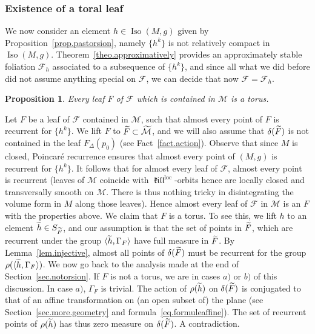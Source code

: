 \documentclass[11pt]{article}
\newtheorem{prop}[theo]{Proposition}
\theoremstyle{definition}
\numberwithin{equation}{section}
\numberwithin{figure}{section}
\numberwithin{table}{section}
\DeclareMathOperator{\Iso}{Iso}
\DeclareMathOperator{\loc}{loc}
\DeclareMathOperator{\kil}{{\mathfrak{kill}}}
\newcommand{\kiloc}{\kil^{\loc}}
\newcommand{\calf}{\mathcal{F}}
\newcommand{\calm}{\mathcal{M}}
\newcommand{\tcalm}{\tilde{\mathcal{M}}}
\newcommand{\tF}{\tilde{{F}}}
\newcommand{\tth}{\tilde{h}}
\let\oldtilde\tilde
\renewcommand*\tilde[1]{\mathchoice{\widetilde{#1}}{\widetilde{#1}}{\widetilde{#1}}{\oldtilde{#1}}}
\begin{document}
\subsubsection{Existence of a toral leaf}\label{sec.toralproof}
We now consider an element $h \in \Iso(M,g)$ given by Proposition~\ref{prop.pastorsion}, namely $\{ h^k \}$ is not relatively compact in $\Iso(M,g)$. Theorem~\ref{theo.approximatively} provides an approximately stable foliation ${\mathcal F}_h$ associated to a subsequence of $\{ h^k \}$, and since all what we did before did not assume anything special on ${\mathcal F}$, we can decide that now $\calf={\mathcal F}_h$.

\begin{prop}\label{prop.existence.tori}
Every leaf $F$ of $\calf$ which is contained in $\calm$ is a torus.
\end{prop}

Let $F$ be a leaf of $\calf$ contained in $\calm$, such that almost every point of $F$ is recurrent for $\{ h^k \}$. We lift $F$ to $\tF \subset \tcalm$, and we will also assume that $\delta(\tF)$ is not contained in the leaf $F_{\Delta}(p_0)$ (see Fact~\ref{fact.action}). Observe that since $M$ is closed, Poincaré recurrence ensures that almost every point of $(M,g)$ is recurrent for $\{ h^k \}$. It follows that for almost every leaf of $\calf$, almost every point is recurrent (leaves of $\calm$ coincide with $\kiloc$-orbits hence are locally closed and transversally smooth on $\calm$. There is thus nothing tricky in disintegrating the volume form in $M$ along those leaves). Hence almost every leaf of $\calf$ in $\calm$ is an $F$ with the properties above. We claim that $F$ is a torus. To see this, we lift $h$ to an element $\tth \in S_{\tF}$, and our assumption is that the set of points in $\tF$, which are recurrent under the group $\langle \tth, \Gamma_{F}\rangle$ have full measure in $\tF$. By Lemma~\ref{lem.injective}, almost all points of $\delta(\tF)$ must be recurrent for the group $\rho(\langle \tth,\Gamma_{F}\rangle)$. We now go back to the analysis made at the end of Section~\ref{sec.notorsion}. If $F$ is not a torus, we are in cases $a)$ or $b)$ of this discussion. In case $a)$, $\Gamma_F$ is trivial. The action of $\rho(\tth)$ on $\delta(\tF)$ is conjugated to that of an affine transformation on (an open subset of) the plane (see Section~\ref{sec.more.geometry} and formula~\eqref{eq.formuleaffine}). The set of recurrent points of $\rho(\tth)$ has thus zero measure on $\delta(\tF)$. A contradiction.
\end{document}

